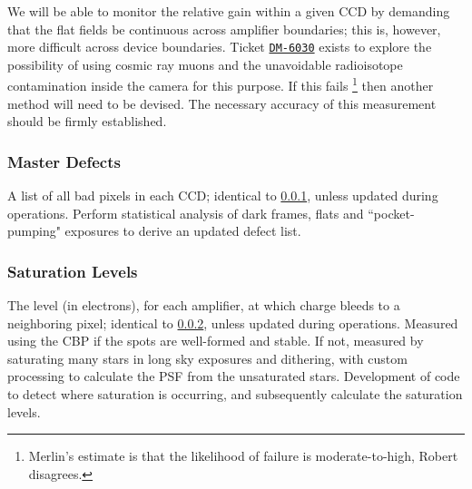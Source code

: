 We will be able to monitor the relative gain within a given CCD by demanding that the flat fields be continuous across amplifier boundaries; this is, however, more difficult across device boundaries. Ticket \hyperref{https://jira.lsstcorp.org/browse/DM-6030}{}{}{\texttt{DM-6030}} exists to explore the possibility of using cosmic ray muons and the unavoidable radioisotope contamination inside the camera for this purpose. If this fails \footnote{Merlin's estimate is that the likelihood of failure is moderate-to-high, Robert disagrees.} then another method will need to be devised. The necessary accuracy of this measurement should be firmly established.


\subsubsection{Master Defects}\label{sec:CPP:output:defectList}
A list of all bad pixels in each CCD; identical to \secsymbol\ref{sec:CPP:output:defectList}, unless updated during operations.
\alg Perform statistical analysis of dark frames, flats and ``pocket-pumping" exposures to derive an updated defect list.


\subsubsection{Saturation Levels}\label{sec:CPP:output:saturationLevel}
The level (in electrons), for each amplifier, at which charge bleeds to a neighboring pixel; identical to \secsymbol\ref{sec:CPP:output:saturationLevel}, unless updated during operations.
\alg Measured using the CBP if the spots are well-formed and stable. If not, measured by saturating many stars in long sky exposures and dithering, with custom processing to calculate the PSF from the unsaturated stars. Development of code to detect where saturation is occurring, and subsequently calculate the saturation levels.


